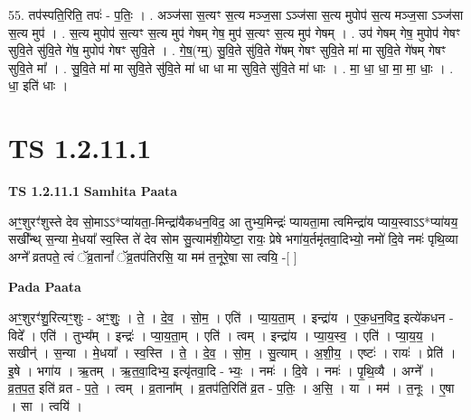\documentclass[17pt]{extarticle}
\begin{document}
55. तप॑स्पति॒रिति॒ तपः॑ - प॒तिः॒ । . अञ्ज॑सा स॒त्यꣳ स॒त्य मञ्ज॒सा ऽञ्ज॑सा स॒त्य मुपोप॑ स॒त्य मञ्ज॒सा ऽञ्ज॑सा स॒त्य मुप॑ । . स॒त्य मुपोप॑ स॒त्यꣳ स॒त्य मुप॑ गेषम् गेष॒ मुप॑ स॒त्यꣳ स॒त्य मुप॑ गेषम् । . उप॑ गेषम् गेष॒ मुपोप॑ गेषꣳ सुवि॒ते सु॑वि॒ते गे॑ष॒ मुपोप॑ गेषꣳ सुवि॒ते । . गे॒ष॒(ग्म्॒) सु॒वि॒ते सु॑वि॒ते गे॑षम् गेषꣳ सुवि॒ते मा॑ मा सुवि॒ते गे॑षम् गेषꣳ सुवि॒ते मा᳚ । . सु॒वि॒ते मा॑ मा सुवि॒ते सु॑वि॒ते मा॑ धा धा मा सुवि॒ते सु॑वि॒ते मा॑ धाः । . मा॒ धा॒ धा॒ मा॒ मा॒ धाः॒ । . धा॒ इति॑ धाः । \newline
\pagebreak
{}
\section*{ TS 1.2.11.1 }

\textbf{TS 1.2.11.1 } \newline
\textbf{Samhita Paata} \newline

अꣳ॒॒शुरꣳ॑शुस्ते देव सो॒माऽऽ*प्या॑यता॒-मिन्द्रा॑यैकधन॒विद॒ आ तुभ्य॒मिन्द्रः॑ प्यायता॒मा त्वमिन्द्रा॑य प्याय॒स्वाऽऽ*प्या॑यय॒ सखी᳚न्थ् स॒न्या मे॒धया᳚ स्व॒स्ति ते॑ देव सोम सु॒त्याम॑शी॒येष्टा॒ रायः॒ प्रेषे भगा॑य॒र्तमृ॑तवा॒दिभ्यो॒ नमो॑ दि॒वे नमः॑ पृथि॒व्या अग्ने᳚ व्रतपते॒ त्वं ॅव्र॒तानां᳚ ॅव्र॒तप॑तिरसि॒ या मम॑ त॒नूरे॒षा सा त्वयि॒ -[ ] \newline

\textbf{Pada Paata} \newline

अꣳ॒॒शुरꣳ॑शु॒रित्यꣳ॒॒शुः - अꣳ॒॒शुः॒ । ते॒ । दे॒व॒ । सो॒म॒ । एति॑ । प्या॒य॒ता॒म् । इन्द्रा॑य । ए॒क॒ध॒न॒विद॒ इत्ये॑कधन - विदे᳚ । एति॑ । तुभ्य᳚म् । इन्द्रः॑ । प्या॒य॒ता॒म् । एति॑ । त्वम् । इन्द्रा॑य । प्या॒य॒स्व॒ । एति॑ । प्या॒य॒य॒ । सखीन्॑ । स॒न्या । मे॒धया᳚ । स्व॒स्ति । ते॒ । दे॒व॒ । सो॒म॒ । सु॒त्याम् । अ॒शी॒य॒ । एष्टः॑ । रायः॑ । प्रेति॑ । इ॒षे । भगा॑य । ऋ॒तम् । ऋ॒त॒वा॒दिभ्य॒ इत्यृ॑तवा॒दि - भ्यः॒ । नमः॑ । दि॒वे । नमः॑ । पृ॒थि॒व्यै । अग्ने᳚ । व्र॒त॒प॒त॒ इति॑ व्रत - प॒ते॒ । त्वम् । व्र॒ताना᳚म् । व्र॒तप॑ति॒रिति॑ व्र॒त - प॒तिः॒ । अ॒सि॒ । या । मम॑ । त॒नूः । ए॒षा । सा । त्वयि॑ ।  \newline
\end{document}

